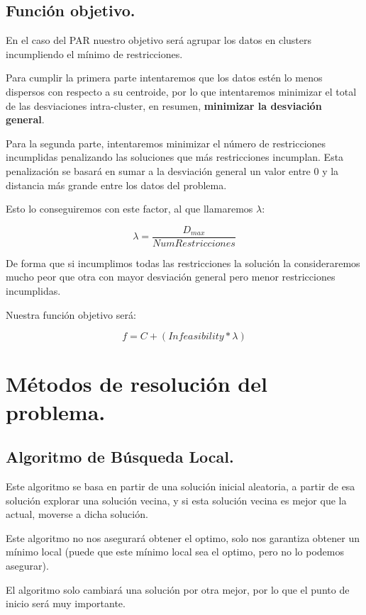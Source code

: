 \documentclass[12pt, spanish]{article}
\begin{document}
\subsection{Función objetivo.}

En el caso del PAR nuestro objetivo será agrupar los datos en clusters incumpliendo el mínimo de restricciones.

Para cumplir la primera parte intentaremos que los datos estén lo menos dispersos con respecto a su centroide, por lo que intentaremos minimizar el total de las desviaciones intra-cluster, en resumen, \textbf{minimizar la desviación general}. 

Para la segunda parte, intentaremos minimizar el número de restricciones incumplidas penalizando las soluciones que más restricciones incumplan. Esta penalización se basará en sumar a la desviación general un valor entre 0 y la distancia más grande entre los datos del problema.

Esto lo conseguiremos con este factor, al que llamaremos $\lambda$:

$$ \lambda = \frac{D_{max}}{NumRestricciones} $$ 


De forma que si incumplimos todas las restricciones la solución la consideraremos mucho peor que otra con mayor desviación general pero menor restricciones incumplidas.

Nuestra función objetivo será:

$$ f = C + (\textit{Infeasibility} * \lambda) $$ 


\newpage

\section{Métodos de resolución del problema.}

\subsection{Algoritmo de Búsqueda Local.}

Este algoritmo se basa en partir de una solución inicial aleatoria, a partir de esa solución explorar una solución vecina, y si esta solución vecina es mejor que la actual, moverse a dicha solución.

Este algoritmo no nos asegurará obtener el optimo, solo nos garantiza obtener un mínimo local (puede que este mínimo local sea el optimo, pero no lo podemos asegurar).

El algoritmo solo cambiará una solución por otra mejor, por lo que el punto de inicio será muy importante.
\end{document}
